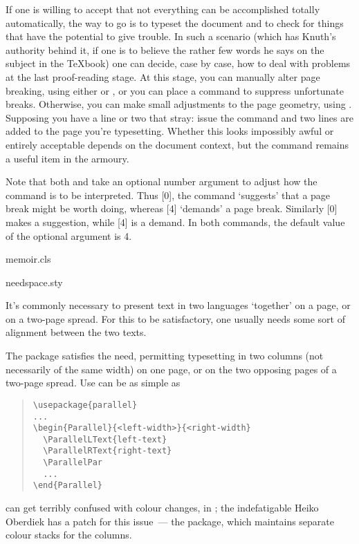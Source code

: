 If one is willing to accept that not everything can be accomplished
totally automatically, the way to go is to typeset the document and to
check for things that have the potential to give trouble.  In such a
scenario (which has Knuth's authority behind it, if one is to believe
the rather few words he says on the subject in the \TeX{}book) one can
decide, case by case, how to deal with problems at the last
proof-reading stage.  At this stage, you can manually alter page
breaking, using either  or , or you can
place a  command to suppress unfortunate breaks.
Otherwise, you can make small adjustments to the page geometry, using
.  Supposing you have a line or two that stray:
issue the command  and
two lines are added to the page you're typesetting.  Whether this
looks impossibly awful or entirely acceptable depends on the document
context, but the command remains a useful item in the armoury.

Note that both  and  take an optional
number argument to adjust how the command is to be interpreted.  Thus
[0], the command `suggests' that a page break
might be worth doing, whereas [4] `demands' a
page break.  Similarly [0] makes a suggestion,
while [4] is a demand.  In both commands, the
default value of the optional argument is 4.
\begin{ctanrefs}
\item[memoir.cls]
\item[needspace.sty]
\end{ctanrefs}


It's commonly necessary to present text in two languages `together' on a
page, or on a two-page spread.  For this to be satisfactory, one usually
needs some sort of alignment between the two texts.

The  package satisfies the need, permitting
typesetting in two columns (not necessarily of the same width) on one
page, or on the two opposing pages of a two-page spread.  Use can be
as simple as
\begin{quote}
\begin{verbatim}
\usepackage{parallel}
...
\begin{Parallel}{<left-width>}{<right-width}
  \ParallelLText{left-text}
  \ParallelRText{right-text}
  \ParallelPar
  ...
\end{Parallel}
\end{verbatim}
\end{quote}
 can get terribly confused with colour changes, in
\PDFTeX{}; the indefatigable Heiko Oberdiek has a patch for this
issue~--- the  package, which maintains
separate colour stacks for the columns.

